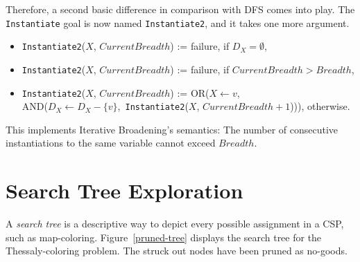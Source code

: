 \documentclass{ws-ijait}
\begin{document}
Therefore, a second basic difference in comparison with DFS
comes into play. The \texttt{Instantiate} goal is now named
\texttt{Instantiate2}, and it takes one more argument.
\begin{itemize}
  \item \texttt{Instantiate2}($X$,
                              $\mathit{CurrentBreadth}$) :=
          \textsf{failure},
          if $D_X = \emptyset$,
  \item \texttt{Instantiate2}($X$,
                              $\mathit{CurrentBreadth}$) :=
          \textsf{failure},
          if $\mathit{CurrentBreadth} > \mathit{Breadth}$,
  \item \texttt{Instantiate2}($X$,
                              $\mathit{CurrentBreadth}$) :=
          \textsf{OR}($X \! \gets \! v$, \\
            \textsf{AND}($D_X \!\! \gets \!\!
                D_X \!\! - \!\! \{v\}$,\,
              \texttt{Instantiate2}($X$,
                $\mathit{CurrentBreadth} + 1$))), otherwise.
\end{itemize}
This implements Iterative Broadening's semantics: The number
of consecutive instantiations to the same variable cannot
exceed $\mathit{Breadth}$.


\section{Search Tree Exploration\label{search-tree}}

A \emph{search tree} is a descriptive way to depict every
possible assignment in a CSP, such as map-coloring.
Figure~\ref{pruned-tree} displays the search tree for the
Thessaly-coloring problem. The struck out nodes have been
pruned as no-goods.
\end{document}
